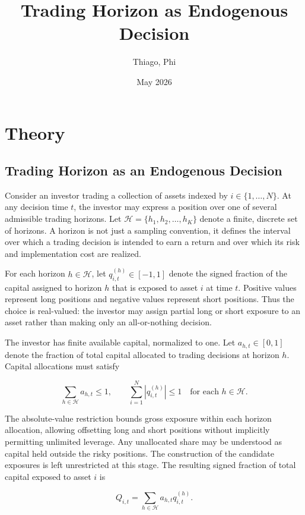 \documentclass{article}
\title{Trading Horizon as Endogenous Decision}
\author{Thiago, Phi}
\date{May 2026}
\begin{document}
\maketitle

\section{Theory}

\subsection{Trading Horizon as an Endogenous Decision}

Consider an investor trading a collection of assets indexed by
$i \in \{1, \ldots, N\}$. At any decision time $t$, the investor may
express a position over one of several admissible trading horizons. Let
$
    \mathcal{H} = \{h_1, h_2, \ldots, h_K\}
$
denote a finite, discrete set of horizons. A horizon is not just a
sampling convention, it defines the interval over which a trading
decision is intended to earn a return and over which its risk and
implementation cost are realized.

For each horizon $h \in \mathcal{H}$, let
$q_{i,t}^{(h)} \in [-1,1]$ denote the signed fraction of the capital
assigned to horizon $h$ that is exposed to asset $i$ at time $t$.
Positive values represent long positions and negative values represent
short positions. Thus the choice is real-valued: the investor may assign
partial long or short exposure to an asset rather than making only an
all-or-nothing decision.

The investor has finite available capital, normalized to one. Let
$a_{h,t} \in [0,1]$ denote the fraction of total capital allocated to
trading decisions at horizon $h$. Capital allocations must satisfy

\[
    \sum_{h \in \mathcal{H}} a_{h,t} \leq 1,
    \qquad
    \sum_{i=1}^{N} \left|q_{i,t}^{(h)}\right| \leq 1
    \quad \text{for each } h \in \mathcal{H}.
\]

The absolute-value restriction bounds gross exposure within each
horizon allocation, allowing offsetting long and short positions without
implicitly permitting unlimited leverage. Any unallocated share may be
understood as capital held outside the risky positions. The construction
of the candidate exposures is left unrestricted at this stage. The
resulting signed fraction of total capital exposed to asset $i$ is

\[
    Q_{i,t} = \sum_{h \in \mathcal{H}} a_{h,t} q_{i,t}^{(h)}.
\]
\end{document}
